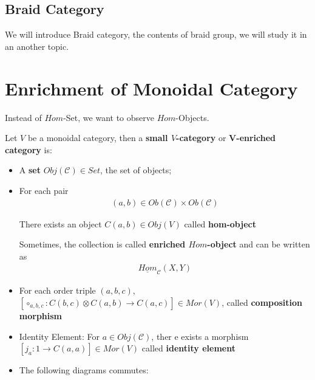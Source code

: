 \documentclass[Total.tex]{subfiles}
\begin{document}
			\subsection{Braid Category}
			
			We will introduce Braid category, the contents of braid group, we will study it in an another topic.
			
			
		\section{Enrichment of Monoidal Category}
		
			Instead of $Hom$-Set, we want to observe $Hom$-Objects.
			\begin{Def}
				Let $V$ be a monoidal category, then a \textbf{small $V$-category} or \textbf{V-enriched category} is:
				\begin{itemize}
					\item A \textbf{set} $Obj(\mathcal{C})\in Set$, the set of objects;
					\item For each pair
					\begin{gather*}
						(a,b)\in Ob(\mathcal{C})\times Ob( \mathcal{C})
					\end{gather*}
					
					There exists an object $C(a,b)\in Obj(V)$ called \textbf{hom-object}
					
					Sometimes, the collection is called \textbf{enriched $Hom$-object} and can be written as 
					\begin{gather*}
						\underline{Hom}_\mathcal{C}(X,Y)
					\end{gather*}
					\item For each order triple $(a,b,c)$, $[\circ_{a,b,c}:C(b,c)\otimes C(a,b)\rightarrow C(a,c)]\in Mor(V)$, called \textbf{composition morphism}
					\item Identity Element: For $a\in Obj(\mathcal{C})$, ther e exists a morphism $[j_a:1\rightarrow C(a,a)]\in Mor(V)$ called \textbf{identity element}
					\item The following diagrams commutes:
					\begin{center}
						\\ 
					\end{center}
				\end{itemize}
			\end{Def}
\end{document}
